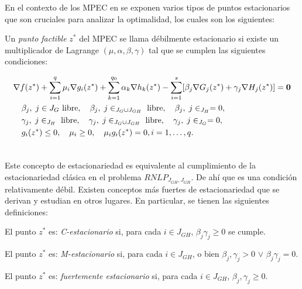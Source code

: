 En el contexto de los MPEC en \cite{Flegel2003AFJ} se exponen varios tipos de puntos estacionarios que son cruciales para analizar la optimalidad, los cuales son los siguientes:
\begin{definition}
    Un \textit{punto factible} $z^*$ del MPEC se llama débilmente estacionario si existe un multiplicador de Lagrange $ (\mu, \alpha, \beta, \gamma)$ tal que se cumplen las siguientes condiciones:
    
\begin{align}
& \nabla f(z^*) + \sum_{i=1}^q \mu_i\nabla g_i(z^*) + \sum_{k=1}^{q_0} \alpha_k\nabla h_k(z^*) - \sum_{i=1}^{s} [\beta_j\nabla G_j(z^*) + \gamma_j\nabla H_j(z^*)] = \vec{0} \notag\\
    & \quad \begin{aligned}
        & \beta_j,\; j\in {J_G} \text{ libre}, \quad  \beta_j,\; j\in _{J_G\cup J_{GH}} \text{ libre}, \quad \beta_j,\; j\in _{J_H}= 0, \\
        &  \gamma_j,\; j\in _{J_H} \text{ libre}, \quad  \gamma_j,\; j\in _{J_G\cup J_{GH}} \text{ libre}, \quad \gamma_j,\; j\in _{J_G}= 0,  \\
        & g_i(z^*) \leq 0, \quad \mu_i \geq 0, \quad \mu_i g_i(z^*) = 0, i=1,\ldots, q.
    \end{aligned} \\
& \label{eq:Definici\'on_punto_debilemente_estacionario} \notag
\end{align}
\end{definition}

Este concepto de estacionariedad es equivalente al cumplimiento de la estacionariedad cl\'asica en el problema $RNLP_{J_{GH},J_{GH}}$. De ah\'i que  es una condición relativamente débil. Existen conceptos más fuertes de estacionariedad que se derivan y estudian en otros lugares. En particular, se tienen las siguientes definiciones:

 \begin{definition}
  El punto $z^*$ es: \textit{C-estacionario} si, para cada $i \in J_{GH}$, $\beta_j\gamma_j \geq 0$ se cumple.
\end{definition}
\begin{definition}
    El punto $z^*$ es: \textit{M-estacionario} si, para cada $i \in J_{GH}$, o bien $\beta_j,\gamma_j > 0$ $\vee$ $\beta_j \gamma_j = 0$.
\end{definition}
 \begin{definition}
    El punto $z^*$ es: \textit{fuertemente estacionario}  si, para cada $i \in J_{GH}$, $\beta_j, \gamma_j \geq 0$.
\end{definition}


